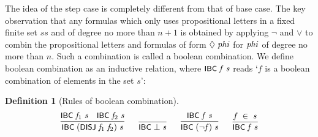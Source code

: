 \documentclass[letterpaper]{article}
\newtheorem{defn}{Definition}
\renewcommand{\HOLConst}[1]{{\textsf{\upshape\small #1}}}
\renewcommand{\HOLinline}[1]{\ensuremath{#1}}
\begin{document}
The idea of the step case is completely different from that of base case. The key observation that any formulas which only uses propositional letters in a fixed finite set $ss$ and of degree no more than $n+1$ is obtained by applying $\lnot$ and $\lor$ to combin the propositional letters and formulas of form \HOLinline{\HOLSymConst{\ensuremath{\Diamond}}\;\HOLFreeVar{phi}} for \HOLinline{\HOLFreeVar{phi}} of degree no more than $n$. Such a combination is called a boolean combination. We define boolean combination as an inductive relation, where \HOLinline{\HOLConst{IBC}\;\HOLFreeVar{f}\;\HOLFreeVar{s}} reads `$f$ is a boolean combination of elements in the set $s$':
\begin{defn}[Rules of boolean combination]
\[
\begin{array}{c}
  \infer{\HOLinline{\HOLConst{IBC}\;(\HOLConst{DISJ}\;\HOLFreeVar{f\sb{\mathrm{1}}}\;\HOLFreeVar{f\sb{\mathrm{2}}})\;\HOLFreeVar{s}}}{\HOLinline{\HOLConst{IBC}\;\HOLFreeVar{f\sb{\mathrm{1}}}\;\HOLFreeVar{s}}&\HOLinline{\HOLConst{IBC}\;\HOLFreeVar{f\sb{\mathrm{2}}}\;\HOLFreeVar{s}}} \ \ \ \ \ 
  \infer{\HOLinline{\HOLConst{IBC}\;\HOLSymConst{\ensuremath{\bot}}\;\HOLFreeVar{s}}}{} \ \ \ \ \ 
  \infer{\HOLinline{\HOLConst{IBC}\;(\HOLSymConst{\HOLTokenNeg{}}\HOLFreeVar{f})\;\HOLFreeVar{s}}}{\HOLinline{\HOLConst{IBC}\;\HOLFreeVar{f}\;\HOLFreeVar{s}}} \ \ \ \ \
  \infer{\HOLinline{\HOLConst{IBC}\;\HOLFreeVar{f}\;\HOLFreeVar{s}}}{\HOLinline{\HOLFreeVar{f}\;\HOLSymConst{\HOLTokenIn{}}\;\HOLFreeVar{s}}}
\end{array}
\]
\end{defn}
\end{document}
